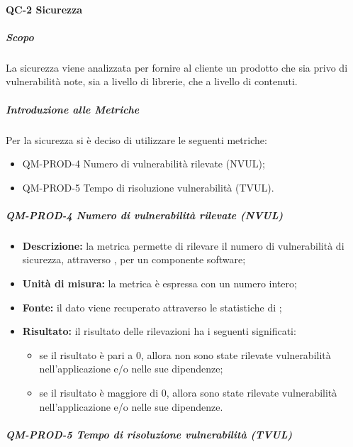 		\paragraph{QC-2 Sicurezza}
		\subparagraph{Scopo}
			La sicurezza viene analizzata per fornire al cliente un prodotto che sia privo di vulnerabilità note, sia a livello di librerie, che a livello di contenuti.
		\subparagraph{Introduzione alle Metriche}
			Per la sicurezza si è deciso di utilizzare le seguenti metriche:
			\begin{itemize}
				\item QM-PROD-4 Numero di vulnerabilità rilevate (NVUL);
				\item QM-PROD-5 Tempo di risoluzione vulnerabilità (TVUL).
			\end{itemize}
			\subparagraph{ QM-PROD-4 Numero di vulnerabilità rilevate (NVUL)}
			\begin{itemize}
      			\item \textbf{Descrizione: }
					la metrica permette di rilevare il numero di vulnerabilità di sicurezza, attraverso , per un componente software;
				\item \textbf{Unità di misura: }
					la metrica è espressa con un numero intero;
				\item \textbf{Fonte: }
					il dato viene recuperato attraverso le statistiche di ;
				\item \textbf{Risultato: }
					il risultato delle rilevazioni ha i seguenti significati:
					\begin{itemize}
						\item se il risultato è pari a 0, allora non sono state rilevate vulnerabilità nell'applicazione e/o nelle sue dipendenze;
						\item se il risultato è maggiore di 0, allora sono state rilevate vulnerabilità nell'applicazione e/o nelle sue dipendenze.
					\end{itemize}
			\end{itemize}
			\subparagraph{ QM-PROD-5 Tempo di risoluzione vulnerabilità (TVUL) }
